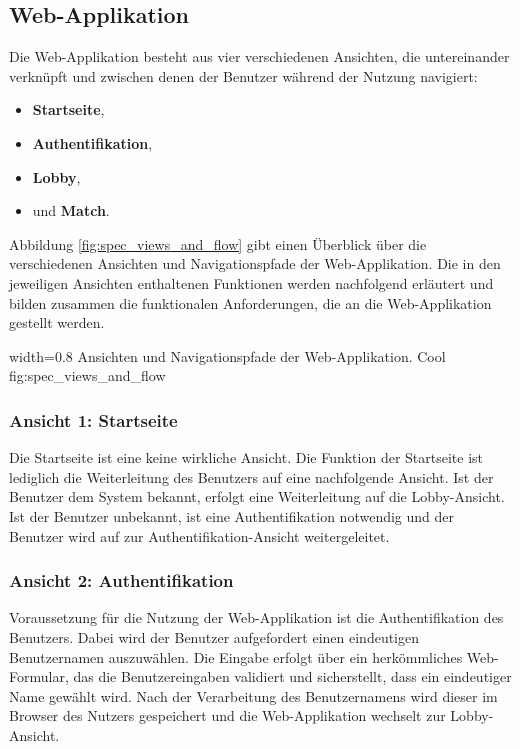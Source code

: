 \subsection{Web-Applikation}\label{web-applikation}

Die Web-Applikation besteht aus vier verschiedenen Ansichten, die
untereinander verknüpft und zwischen denen der Benutzer während der
Nutzung navigiert:

\begin{itemize}
\tightlist
\item
  \textbf{Startseite},
\item
  \textbf{Authentifikation},
\item
  \textbf{Lobby},
\item
  und \textbf{Match}.
\end{itemize}

Abbildung \ref{fig:spec_views_and_flow} gibt einen Überblick über die
verschiedenen Ansichten und Navigationspfade der Web-Applikation. Die in
den jeweiligen Ansichten enthaltenen Funktionen werden nachfolgend
erläutert und bilden zusammen die funktionalen Anforderungen, die an die
Web-Applikation gestellt werden.

    {width=0.8\textwidth}
    {Ansichten und Navigationspfade der Web-Applikation.}
    {Cool}
    {fig:spec_views_and_flow}

\subsubsection*{Ansicht 1: Startseite}

Die Startseite ist eine keine wirkliche Ansicht. Die Funktion der
Startseite ist lediglich die Weiterleitung des Benutzers auf eine
nachfolgende Ansicht. Ist der Benutzer dem System bekannt, erfolgt eine
Weiterleitung auf die Lobby-Ansicht. Ist der Benutzer unbekannt, ist
eine Authentifikation notwendig und der Benutzer wird auf zur
Authentifikation-Ansicht weitergeleitet.

\subsubsection*{Ansicht 2: Authentifikation}

Voraussetzung für die Nutzung der Web-Applikation ist die
Authentifikation des Benutzers. Dabei wird der Benutzer aufgefordert
einen eindeutigen Benutzernamen auszuwählen. Die Eingabe erfolgt über
ein herkömmliches Web-Formular, das die Benutzereingaben validiert und
sicherstellt, dass ein eindeutiger Name gewählt wird. Nach der
Verarbeitung des Benutzernamens wird dieser im Browser des Nutzers
gespeichert und die Web-Applikation wechselt zur Lobby-Ansicht.

